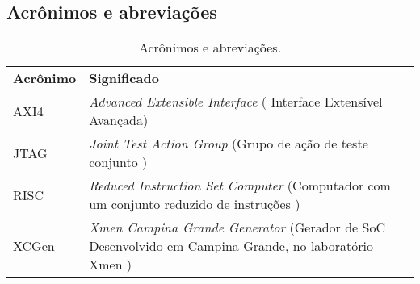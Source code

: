 \newpage
\subsection{Acrônimos e abreviações} %
\begin{table}[h]
  \centering
      {\renewcommand\arraystretch{1.25}
        \caption{Acrônimos e abreviações.}
        \vspace{0.3cm}
        \begin{tabular}{ l l }
          \cline{1-1}\cline{2-2}  
          \multicolumn{1}{|p{3.850cm}|}{\textbf{Acrônimo} \centering } &
          \multicolumn{1}{p{8cm}|}{\textbf{Significado} \centering }
          \\  
          \cline{1-1}\cline{2-2}  
          \multicolumn{1}{|p{3.850cm}|}{AXI4 \centering } &
          \multicolumn{1}{p{8cm}|}{{\it Advanced Extensible Interface} (
Interface Extensível Avançada) \centering }
         \\  
          \cline{1-1}\cline{2-2}  
          \multicolumn{1}{|p{3.850cm}|}{JTAG \centering } &
          \multicolumn{1}{p{8cm}|}{{\it Joint Test Action Group} (Grupo de ação de teste conjunto
) \centering }
\\
         \cline{1-1}\cline{2-2}  
          \multicolumn{1}{|p{3.850cm}|}{RISC \centering } &
          \multicolumn{1}{p{8cm}|}{{\it Reduced Instruction Set Computer} (Computador com um conjunto reduzido de instruções
) \centering }
\\
         \cline{1-1}\cline{2-2}  
          \multicolumn{1}{|p{3.850cm}|}{XCGen \centering } &
          \multicolumn{1}{p{8cm}|}{{\it Xmen Campina Grande Generator} (Gerador de SoC Desenvolvido em Campina Grande, no laboratório Xmen
) \centering }
     
          \\  
          \hline
          
      \end{tabular} }
\end{table}



\label{sub:acrônimos_e_abreviações}






